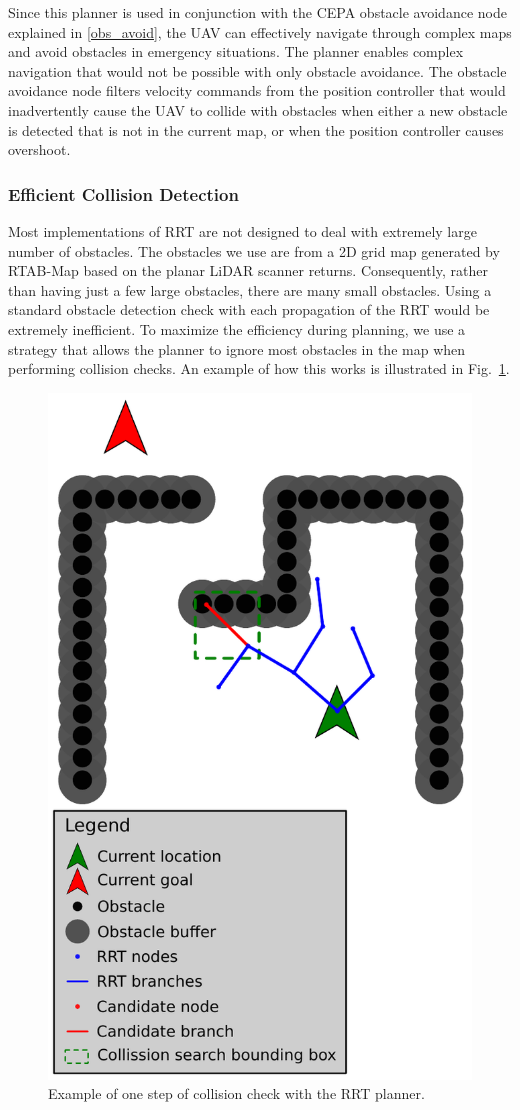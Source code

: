 \documentclass[letterpaper, 10 pt, conference]{ieeeconf}  %
\begin{document}
Since this planner is used in conjunction with the CEPA obstacle avoidance node explained in \ref{obs_avoid}, the UAV can effectively navigate through complex maps and avoid obstacles in emergency situations. The planner enables complex navigation that would not be possible with only obstacle avoidance. The obstacle avoidance node filters velocity commands from the position controller that would inadvertently cause the UAV to collide with obstacles when either a new obstacle is detected that is not in the current map, or when the position controller causes overshoot.

\subsubsection{Efficient Collision Detection}
Most implementations of RRT are not designed to deal with extremely large number of obstacles. The obstacles we use are from a 2D grid map generated by RTAB-Map based on the planar LiDAR scanner returns. Consequently, rather than having just a few large obstacles, there are many small obstacles. Using a standard obstacle detection check with each propagation of the RRT would be extremely inefficient. To maximize the efficiency during planning, we use a strategy that allows the planner to ignore most obstacles in the map when performing collision checks. An example of how this works is illustrated in Fig.~\ref{fig:rrt_sample}.

\begin{figure}
\centering
\includegraphics[width=0.8\linewidth]{rrt_sample}
\caption{Example of one step of collision check with the RRT planner.}
\label{fig:rrt_sample}
\end{figure}
\end{document}
